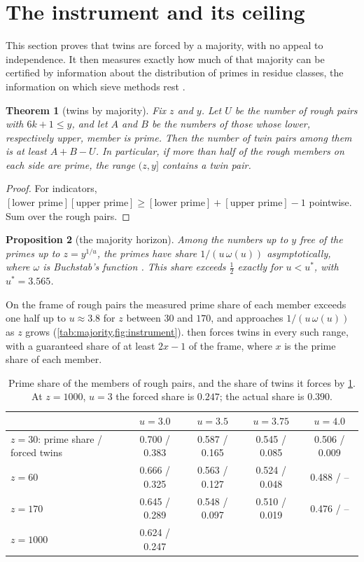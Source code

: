 \documentclass[11pt]{article}
\newtheorem{theorem}{Theorem}[section]
\newtheorem{proposition}[theorem]{Proposition}
\theoremstyle{definition}\newtheorem{definition}[theorem]{Definition}
\theoremstyle{remark}\newtheorem{remark}[theorem]{Remark}
\begin{document}
\section{The instrument and its ceiling}\label{sec:instrument}

This section proves that twins are forced by a majority, with no appeal to independence. It then measures exactly how much of that majority can be certified by information about the distribution of primes in residue classes, the information on which sieve methods rest \cite{FI}.

\begin{theorem}[twins by majority]\label{thm:pigeonhole}
Fix $z$ and $y$. Let $U$ be the number of rough pairs with $6k+1\le y$, and let $A$ and $B$ be the numbers of those whose lower, respectively upper, member is prime. Then the number of twin pairs among them is at least $A+B-U$. In particular, if more than half of the rough members on each side are prime, the range $(z,y]$ contains a twin pair.
\end{theorem}
\begin{proof}
For indicators, $[\text{lower prime}][\text{upper prime}]\ge[\text{lower prime}]+[\text{upper prime}]-1$ pointwise. Sum over the rough pairs.
\end{proof}

\begin{proposition}[the majority horizon]\label{prop:majority}
Among the numbers up to $y$ free of the primes up to $z=y^{1/u}$, the primes have share $1/(u\,\omega(u))$ asymptotically, where $\omega$ is Buchstab's function \cite{FI}. This share exceeds $\tfrac12$ exactly for $u<u^*$, with $u^*=3.565$.
\end{proposition}

On the frame of rough pairs the measured prime share of each member exceeds one half up to $u\approx3.8$ for $z$ between $30$ and $170$, and approaches $1/(u\,\omega(u))$ as $z$ grows (\cref{tab:majority,fig:instrument}).  then forces twins in every such range, with a guaranteed share of at least $2x-1$ of the frame, where $x$ is the prime share of each member.

\begin{table}[t]\centering\small
\begin{tabular}{@{}lcccc@{}}\toprule
 & $u=3.0$ & $u=3.5$ & $u=3.75$ & $u=4.0$\\\midrule
$z=30$: prime share / forced twins & 0.700 / 0.383 & 0.587 / 0.165 & 0.545 / 0.085 & 0.506 / 0.009\\
$z=60$ & 0.666 / 0.325 & 0.563 / 0.127 & 0.524 / 0.048 & 0.488 / --\\
$z=170$ & 0.645 / 0.289 & 0.548 / 0.097 & 0.510 / 0.019 & 0.476 / --\\
$z=1000$ & 0.624 / 0.247 & & & \\\bottomrule
\end{tabular}
\caption{Prime share of the members of rough pairs, and the share of twins it forces by \cref{thm:pigeonhole}. At $z=1000$, $u=3$ the forced share is $0.247$; the actual share is $0.390$.}
\label{tab:majority}
\end{table}
\end{document}
